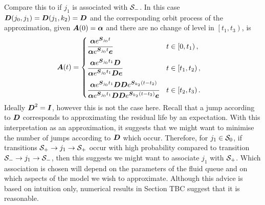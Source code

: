 Compare this to if \({j_1}\) is associated with \(\mathcal{S}_-\). In this case \(\boldsymbol{D}({j_0},{j_1})=\boldsymbol{D}({j_1},k_2)=\boldsymbol{D}\) and the corresponding orbit process of the approximation, given \(\boldsymbol A(0) = \boldsymbol \alpha\) and there are no change of level in \(\left[t_1,t_3\right)\), is 
\begin{align*}
\boldsymbol A(t) &= \begin{cases} 
	\cfrac{\boldsymbol \alpha e^{\boldsymbol{S}_{j_0}t}}{\boldsymbol \alpha e^{\boldsymbol{S}_{{j_0}}t}\boldsymbol e} & t\in\left[0,t_1\right), \\[10pt]
	\cfrac{\boldsymbol \alpha e^{\boldsymbol{S}_{j_0}t_1}\boldsymbol{D}}{\boldsymbol \alpha e^{\boldsymbol{S}_{j_0}t_1}\boldsymbol{D}\boldsymbol e} & t\in\left[t_1,t_2\right), \\[10pt] 
	\cfrac{\boldsymbol \alpha e^{\boldsymbol{S}_{j_0}t_1}\boldsymbol{D}\boldsymbol{D}e^{\boldsymbol{S}_{k_2}(t-t_2)}}{\boldsymbol \alpha e^{\boldsymbol{S}_{j_0}t_1}\boldsymbol{D}\boldsymbol{D}e^{\boldsymbol{S}_{k_2}(t-t_2)}\boldsymbol e} & t\in\left[t_2,t_3\right).
\end{cases}
\end{align*}
Ideally \(\boldsymbol D^2=\boldsymbol I\), however this is not the case here. Recall that a jump according to \(\boldsymbol{D}\) corresponds to approximating the residual life by an expectation. With this interpretation as an approximation, it suggests that we might want to minimise the number of jumps according to \(\boldsymbol D\) which occur. Therefore, for \(j_1\in \mathcal{S}_0\), if transitions \(\mathcal{S}_+\to j_1\to \mathcal{S}_+\) occur with high probability compared to transition \(\mathcal{S}_-\to j_1\to \mathcal{S}_-\), then this suggests we might want to associate \(j_1\) with \(\mathcal{S}_+\). Which association is chosen will depend on the parameters of the fluid queue and on which aspects of the model we wish to approximate. Although this advice is based on intuition only, numerical results in Section TBC suggest that it is reasonable. 


